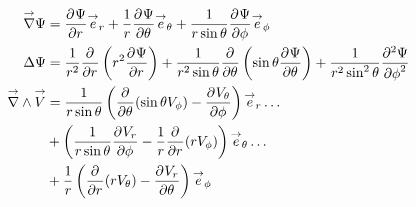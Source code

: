 \begin{align*}
\vgrad \Psi &= \ddr{r}{\Psi} \vect e_r + \frac{1}{r}\ddr{\theta}{\Psi}\vect e_\theta + \frac{1}{r\sin\theta}\ddr{\phi}{\Psi} \vect e_\phi\\
 \Delta \Psi & = \frac{1}{r^2}\ddr{r}{}\left(r^2\ddr{r}{\Psi}\right)
+ \frac{1}{r^2\sin\theta}\ddr{\theta}{}\left(\sin\theta\ddr{\theta}{\Psi}\right)
+ \frac{1}{r^2\sin^2\theta}\ddr[2]{\phi}{\Psi} \\
\vrot \vect V &= \frac{1}{r\sin\theta}\left(\ddr{\theta}{}(\sin\theta V_\phi)-\ddr{\phi}{V_\theta}\right)\vect e_r \dots\\
&+ \left(\frac{1}{r\sin\theta}\ddr{\phi}{V_r} - \frac{1}{r}\ddr{r}{}(rV_\phi)\right) \vect e_\theta \dots \\
&+ \frac{1}{r}\left( \ddr{r}{}(rV_\theta) - \ddr{\theta}{V_r}\right)\vect e_\phi
\end{align*}


